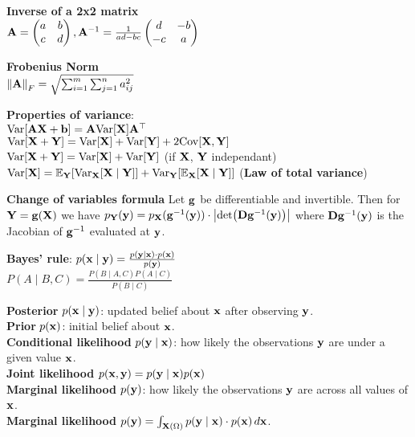 \begin{framed}
    \textbf{Inverse of a 2x2 matrix}\\
    $\mathbf{A}=\begin{pmatrix}a&b\\c&d\end{pmatrix}, \mathbf{A}^{-1}=\frac{1}{ad-bc}\begin{pmatrix}d&-b\\-c&a\end{pmatrix}$
\end{framed}
\begin{framed}
    \textbf{Frobenius Norm}\\
    \(\norm{\mA}_F=\sqrt{\sum_{i=1}^{m}{\sum_{j=1}^{n}{a_{ij}^2}}}\)
\end{framed}
\begin{framed}
\textbf{Properties of variance}:\\
$\Var{\mA\rX + \vb} = \mA\Var{\rX}\transpose{\mA}$\\
$\Var{\rX + \rY} = \Var{\rX} + \Var{\rY} + 2 \Cov{\rX, \rY}$\\
$\Var{\rX + \rY} = \Var{\rX} + \Var{\rY}$ (if $\mathbf{X}$, $\mathbf{Y}$ independant)
$\Var{\rX} = \E[\rY]{\Var[\rX]{\rX \mid \rY}} + \Var[\rY]{\E[\rX]{\rX \mid \rY}}$ (\textbf{Law of total variance})
\end{framed}
\textbf{Change of variables formula}
Let $\mathbf{g}$ be differentiable and invertible. Then for $\mathbf{Y} = \mathbf{g}(\mathbf{X})$ we have $p_\rY(\vy) = p_\rX(\inv{\vg}(\vy)) \cdot \abs{\det{\jac \inv{\vg}(\vy)}}$ where $\mathbf{D} \mathbf{g}^{-1}(\mathbf{y})$ is the Jacobian of $\mathbf{g}^{-1}$ evaluated at $\mathbf{y}$.
\begin{framed}
\textbf{Bayes' rule}: 
$p(\mathbf{x} \mid \mathbf{y}) = \frac{p(\mathbf{y} \mid \mathbf{x}) \cdot p(\mathbf{x})}{p(\mathbf{y})}$ \\
$P(A \mid B, C) = \frac{P(B \mid A, C) P(A \mid C)}{P(B \mid C)}$


\end{framed}
\begin{framed}
    \textbf{Posterior} $p(\mathbf{x} \mid \mathbf{y})$: updated belief about $\mathbf{x}$ after observing $\mathbf{y}$. \\
    \textbf{Prior} $p(\mathbf{x})$: initial belief about $\mathbf{x}$. \\
    \textbf{Conditional likelihood} $p(\mathbf{y} \mid \mathbf{x})$: how likely the observations $\mathbf{y}$ are under a given value $\mathbf{x}$. \\
    \textbf{Joint likelihood} $p(\mathbf{x}, \mathbf{y}) = p(\mathbf{y} \mid \mathbf{x}) p(\mathbf{x})$ \\
    \textbf{Marginal likelihood} $p(\mathbf{y})$: how likely the observations $\mathbf{y}$ are across all values of $\mathbf{x}$. \\
    \textbf{Marginal likelihood} $p(\mathbf{y}) = \int_{\mathbf{X}(\Omega)} p(\mathbf{y} \mid \mathbf{x}) \cdot p(\mathbf{x}) \,d\mathbf{x}$. 
\end{framed}
